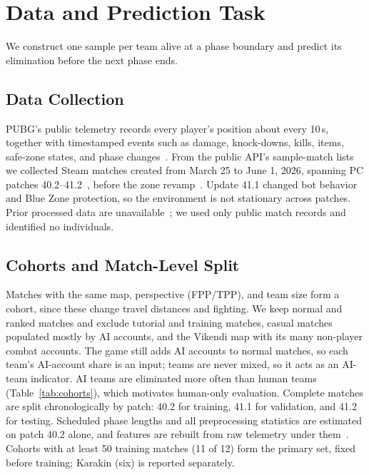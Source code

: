 \documentclass[sigconf,anonymous]{acmart}
\begin{document}
\section{Data and Prediction Task}
\label{sec:method}
We construct one sample per team alive at a phase boundary and predict its elimination before the next phase ends.


\subsection{Data Collection}
\label{sec:method:data}
PUBG's public telemetry records every player's position about every 10\,s, together with timestamped events such as damage, knock-downs, kills, items, safe-zone states, and phase changes~\cite{PUBGAPI}. From the public API's sample-match lists we collected Steam matches created from March 25 to June 1, 2026, spanning PC patches 40.2--41.2~\cite{PUBGPatchNotes2026}, before the zone revamp~\cite{PUBGBlueZone2026}. Update 41.1 changed bot behavior and Blue Zone protection, so the environment is not stationary across patches. Prior processed data are unavailable~\cite{Sagong25a,KRAFTON}; we used only public match records and identified no individuals.

\subsection{Cohorts and Match-Level Split}
\label{sec:method:cohort}
Matches with the same map, perspective (FPP/TPP), and team size form a cohort, since these change travel distances and fighting. We keep normal and ranked matches and exclude tutorial and training matches, casual matches populated mostly by AI accounts, and the Vikendi map with its many non-player combat accounts. The game still adds AI accounts to normal matches, so each team's AI-account share is an input; teams are never mixed, so it acts as an AI-team indicator. AI teams are eliminated more often than human teams (Table~\ref{tab:cohorts}), which motivates human-only evaluation. Complete matches are split chronologically by patch: 40.2 for training, 41.1 for validation, and 41.2 for testing. Scheduled phase lengths and all preprocessing statistics are estimated on patch 40.2 alone, and features are rebuilt from raw telemetry under them~\cite{Kaufman12}. Cohorts with at least 50 training matches (11 of 12) form the primary set, fixed before training; Karakin (six) is reported separately.
\end{document}
